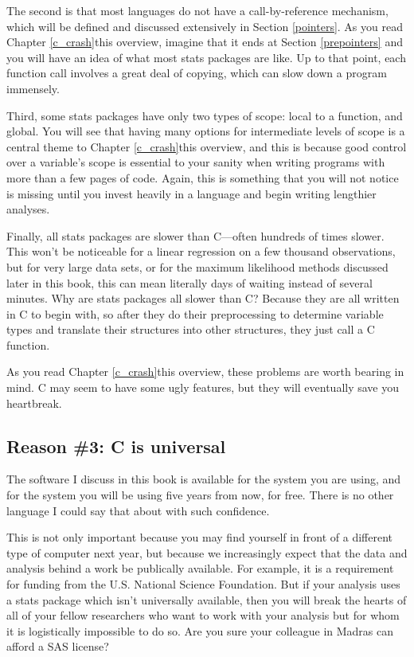 The second is that most languages do not have a call-by-reference
mechanism, which will be defined and discussed extensively in Section
\ref{pointers}. As you read \ifbook Chapter \ref{c_crash}\else this overview\fi, imagine that it ends
at Section \ref{prepointers} and you will have an idea of what most
stats packages are like. Up to that point, each function call involves a
great deal of copying, which can slow down a program immensely.

Third, some stats packages have only two types of scope: local to
a function, and global. You will see that having many options for
intermediate levels of scope is a central theme to \ifbook Chapter \ref{c_crash}\else this overview\fi,
and this is because good control over a variable's scope is essential
to your sanity when writing programs with more than a few pages of
code. Again, this is something that you will not notice is missing until
you invest heavily in a language and begin writing lengthier analyses.

Finally, all stats packages are slower than C---often hundreds of times
slower. This won't be noticeable for a linear regression on a few thousand
observations, but for very large data sets, or for the maximum likelihood
methods discussed later in this book, this can mean literally days of
waiting instead of several minutes.  Why are stats packages all slower
than C? Because they are all written in C to begin with, so after they
do their preprocessing to determine variable types and translate their
structures into other structures, they just call a C function.

As you read \ifbook Chapter \ref{c_crash}\else this overview\fi, these
problems are worth bearing in mind. C may seem to have some ugly
features, but they will eventually save you heartbreak.

\subsection{Reason \#3: C is universal} 
The software I discuss in this book is available for the system you
are using, and for the system you will be using five years from now,
for free. There is no other language I could say that about with such
confidence.

This is not only important because you may find yourself in front of
a different type of computer next year, but because we increasingly
expect that the data and analysis behind a work be publically available.
For example, it is a requirement for funding from the U.S. National
Science Foundation. But if your analysis uses a stats package which
isn't universally available, then you will break the hearts of all of
your fellow researchers who want to work with your analysis but for whom
it is logistically impossible to do so. Are you sure your colleague in
Madras can afford a SAS license?

